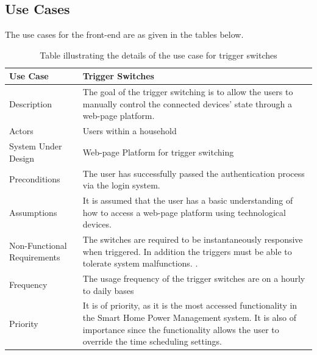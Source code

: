 \documentclass[10pt,twocolumn]{witseiepaper}
\begin{document}
	\subsection{Use Cases}
	The use cases for the front-end are as given in the tables below. 
	\begin{table}[H]
		\centering
		\caption{Table illustrating the details of the use case for trigger switches}
		\label{trigger_switching_use_case}
		\begin{tabular}{| p{22mm} | p{50mm} |}
			\hline
			\textbf{Use Case} & \textbf{Trigger Switches}\\
			\hline
			Description & The goal of the trigger switching is to allow the users to manually control the connected devices' state through a web-page platform.\\
			\hline
			Actors & Users within a household \\
			\hline
			System Under Design & Web-page Platform for trigger switching\\
			\hline
			Preconditions & The user has successfully passed the authentication process via the login system.\\
			\hline
			Assumptions & It is assumed that the user has a basic understanding of how to access a web-page platform using technological devices.\\
			\hline
			Non-Functional Requirements & The switches are required to be instantaneously responsive when triggered. In addition the triggers must be able to tolerate system malfunctions. .\\
			\hline
			Frequency & The usage frequency of the trigger switches are on a hourly to daily bases \\
			\hline
			Priority & It is of priority, as it is the most accessed functionality in the Smart Home Power Management system. It is also of importance since the functionality allows the user to override the time scheduling settings.\\
			\hline
		\end{tabular}
	\end{table}
\end{document}
